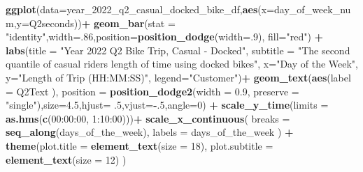 \documentclass[
]{article}
\newenvironment{Shaded}{\begin{snugshade}}{\end{snugshade}}
\newcommand{\AttributeTok}[1]{\textcolor[rgb]{0.13,0.29,0.53}{#1}}
\newcommand{\DecValTok}[1]{\textcolor[rgb]{0.00,0.00,0.81}{#1}}
\newcommand{\FloatTok}[1]{\textcolor[rgb]{0.00,0.00,0.81}{#1}}
\newcommand{\FunctionTok}[1]{\textcolor[rgb]{0.13,0.29,0.53}{\textbf{#1}}}
\newcommand{\NormalTok}[1]{#1}
\newcommand{\SpecialCharTok}[1]{\textcolor[rgb]{0.81,0.36,0.00}{\textbf{#1}}}
\newcommand{\StringTok}[1]{\textcolor[rgb]{0.31,0.60,0.02}{#1}}
\begin{document}
\begin{Shaded}
\begin{Highlighting}[]
\FunctionTok{ggplot}\NormalTok{(}\AttributeTok{data=}\NormalTok{year\_2022\_q2\_casual\_docked\_bike\_df,}\FunctionTok{aes}\NormalTok{(}\AttributeTok{x=}\NormalTok{day\_of\_week\_num,}\AttributeTok{y=}\NormalTok{Q2seconds))}\SpecialCharTok{+}
  \FunctionTok{geom\_bar}\NormalTok{(}\AttributeTok{stat =} \StringTok{"identity"}\NormalTok{,}\AttributeTok{width=}\NormalTok{.}\DecValTok{86}\NormalTok{,}\AttributeTok{position=}\FunctionTok{position\_dodge}\NormalTok{(}\AttributeTok{width=}\NormalTok{.}\DecValTok{9}\NormalTok{), }\AttributeTok{fill=}\StringTok{"red"}\NormalTok{) }\SpecialCharTok{+}
  \FunctionTok{labs}\NormalTok{(}\AttributeTok{title =} \StringTok{"Year 2022 Q2 Bike Trip, Casual {-} Docked"}\NormalTok{,}
       \AttributeTok{subtitle =} \StringTok{"The second quantile of casual rider\textquotesingle{}s length of time using docked bikes"}\NormalTok{,}
       \AttributeTok{x=}\StringTok{"Day of the Week"}\NormalTok{,}
       \AttributeTok{y=}\StringTok{"Length of Trip (HH:MM:SS)"}\NormalTok{,}
       \AttributeTok{legend=}\StringTok{"Customer"}\NormalTok{)}\SpecialCharTok{+}
  \FunctionTok{geom\_text}\NormalTok{(}\FunctionTok{aes}\NormalTok{(}\AttributeTok{label =}\NormalTok{ Q2Text ),}
            \AttributeTok{position =} \FunctionTok{position\_dodge2}\NormalTok{(}\AttributeTok{width =} \FloatTok{0.9}\NormalTok{, }\AttributeTok{preserve =} \StringTok{"single"}\NormalTok{),}\AttributeTok{size=}\FloatTok{4.5}\NormalTok{,}\AttributeTok{hjust=}\NormalTok{ .}\DecValTok{5}\NormalTok{,}\AttributeTok{vjust=}\SpecialCharTok{{-}}\NormalTok{.}\DecValTok{5}\NormalTok{,}\AttributeTok{angle=}\DecValTok{0}\NormalTok{) }\SpecialCharTok{+}
  \FunctionTok{scale\_y\_time}\NormalTok{(}\AttributeTok{limits =} \FunctionTok{as.hms}\NormalTok{(}\FunctionTok{c}\NormalTok{(}\StringTok{\textquotesingle{}00:00:00\textquotesingle{}}\NormalTok{, }\StringTok{\textquotesingle{}1:10:00\textquotesingle{}}\NormalTok{)))}\SpecialCharTok{+}
  \FunctionTok{scale\_x\_continuous}\NormalTok{(}
    \AttributeTok{breaks =} \FunctionTok{seq\_along}\NormalTok{(days\_of\_the\_week), }
    \AttributeTok{labels =}\NormalTok{ days\_of\_the\_week}
\NormalTok{  )  }\SpecialCharTok{+}
  \FunctionTok{theme}\NormalTok{(}\AttributeTok{plot.title =} \FunctionTok{element\_text}\NormalTok{(}\AttributeTok{size =} \DecValTok{18}\NormalTok{),}
        \AttributeTok{plot.subtitle =} \FunctionTok{element\_text}\NormalTok{(}\AttributeTok{size =} \DecValTok{12}\NormalTok{)}
\NormalTok{  ) }
\end{Highlighting}
\end{Shaded}
\end{document}
